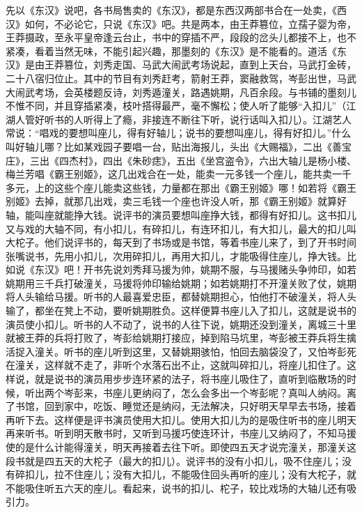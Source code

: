 \documentclass[12pt,UTF8]{ctexbook}
\begin{document}
先以《东汉》说吧，各书局售卖的《东汉》，都是东西汉两部书合在一处卖，《西汉》如何，不必论它，只说《东汉》吧。共是两本，由王莽篡位，立孺子婴为帝，王莽摄政，至永平皇帝逢云台止，书中的穿插不严，段段的岔头儿都接不上，也不紧凑，看着当然无味，不能引起兴趣，那墨刻的《东汉》是不能看的。道活《东汉》是由王莽篡位，刘秀走国、马武大闹武考场说起，直到上天台，马武打金砖，二十八宿归位止。其中的节目有刘秀赶考，箭射王莽，窦融救驾，岑彭出世，马武大闹武考场，会英楼题反诗，刘秀遁潼关，路遇姚期，凡百余段。与书铺的墨刻儿不惟不同，并且穿插紧凑，枝叶搭得最严，毫不懈松；使人听了能够“入扣儿”（江湖人管好听书的人听得上了瘾，非接连不断往下听，说行话叫入扣儿）。江湖艺人常说：“唱戏的要想叫座儿，得有好轴儿；说书的要想叫座儿，得有好扣儿。”什么叫好轴儿哪？比如某戏园子要唱一台，贴出海报儿，头出《大赐福》，二出《善宝庄》，三出《四杰村》，四出《朱砂痣》，五出《坐宫盗令》，六出大轴儿是杨小楼、梅兰芳唱《霸王别姬》，这几出戏合在一处，能卖一元多钱一个座儿，能共卖一千多元，上的这些个座儿能卖这些钱，力量都在那出《霸王别姬》哪！如若将《霸王别姬》去掉，就那几出戏，卖三毛钱一个座也许没人听，那《霸王别姬》就算好轴，能叫座就能挣大钱。说评书的演员要想叫座挣大钱，都得有好扣儿。这书扣儿又与戏的大轴不同，有小扣儿，有碎扣儿，有连环扣儿，有大扣儿，最大的扣儿叫大柁子。他们说评书的，每天到了书场或是书馆，等着书座儿来了，到了开书时间张嘴说书，先用小扣儿，次用碎扣儿，再用大扣儿，才能吸得住座儿，挣大钱。比如说《东汉》吧！开书先说刘秀拜马援为帅，姚期不服，与马援赌头争帅印，如若姚期用三千兵打破潼关，马援将帅印输给姚期；如若姚期打不开潼关败了仗，姚期将人头输给马援。听书的人最喜爱忠臣，都替姚期担心，怕他打不破潼关，将人头输了，都坐在凳上不动，要听姚期胜负。这样便算书座儿入了扣儿，这就是说书的演员使小扣儿。听书的人不动了，说书的人往下说，姚期还没到潼关，离城三十里就被王莽的兵将打败了，岑彭给姚期打接应，掉到陷马坑里，岑彭被王莽兵将生擒活捉入潼关。听书的座儿听到这里，又替姚期骇怕，怕回去脑袋没了，又怕岑彭死在潼关，这样就不走了，非听个水落石出不止，这就叫碎扣儿，将座儿扣住了。这样说，就是说书的演员用步步连环紧的法子，将书座儿吸住了，直听到临散场的时候，听出两个岑彭来，书座儿更纳闷了，怎么会多出一个岑彭呢？真叫人纳闷。离了书馆，回到家中，吃饭、睡觉还是纳闷，无法解决，只好明天早早去书场，接着再听下去。这样便是评书演员使用大扣儿。使用大扣儿为的是吸住听书的座儿明天再来听书。听到明天散书时，又听到马援巧使连环计，书座儿又纳闷了，不知马援使的是什么计能得潼关，明天再接着去往下听。即使四五天才说完潼关，那潼关这段书就是四五天的大柁子（最大的扣儿）。说评书的没有小扣儿，吸不住座儿；没有碎扣儿，拉不住座儿；没有大扣儿，不能吸住回头再听的座儿；没有大柁子，就不能吸住听五六天的座儿。看起来，说书的扣儿、柁子，较比戏场的大轴儿还有吸引力。
\end{document}
